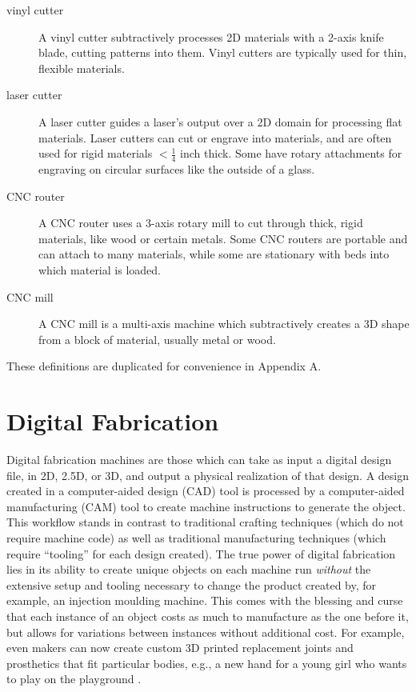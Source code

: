 \begin{description}
\item[vinyl cutter] A vinyl cutter subtractively processes 2D materials with a 2-axis knife blade, cutting patterns into them. Vinyl cutters are typically used for thin, flexible materials.

\item[laser cutter] A laser cutter guides a laser's output over a 2D domain for processing flat materials. Laser cutters can cut or engrave into materials, and are often used for rigid materials $<\frac{1}{4}$ inch thick. Some have rotary attachments for engraving on circular surfaces like the outside of a glass.

\item[CNC router] A CNC router uses a 3-axis rotary mill to cut through thick, rigid materials, like wood or certain metals. Some CNC routers are portable and can attach to many materials, while some are stationary with beds into which material is loaded.

\item[CNC mill] A CNC mill is a multi-axis machine which subtractively creates a 3D shape from a block of material, usually metal or wood.

\end{description}

These definitions are duplicated for convenience in Appendix A.

\section{Digital Fabrication}

Digital fabrication machines are those which can take as input a digital design file, in 2D, 2.5D, or 3D, and output a physical realization of that design. A design created in a computer-aided design (CAD) tool is processed by a computer-aided manufacturing (CAM) tool to create machine instructions to generate the object. This workflow stands in contrast to traditional crafting techniques (which do not require machine code) as well as traditional manufacturing techniques (which require ``tooling'' for each design created). The true power of digital fabrication lies in its ability to create unique objects on each machine run \emph{without} the extensive setup and tooling necessary to change the product created by, for example, an injection moulding machine. This comes with the blessing and curse that each instance of an object costs as much to manufacture as the one before it, but allows for variations between instances without additional cost. For example, even makers can now create custom 3D printed replacement joints and prosthetics that fit particular bodies, e.g., a new hand for a young girl who wants to play on the playground \cite{myers-sophie}.

